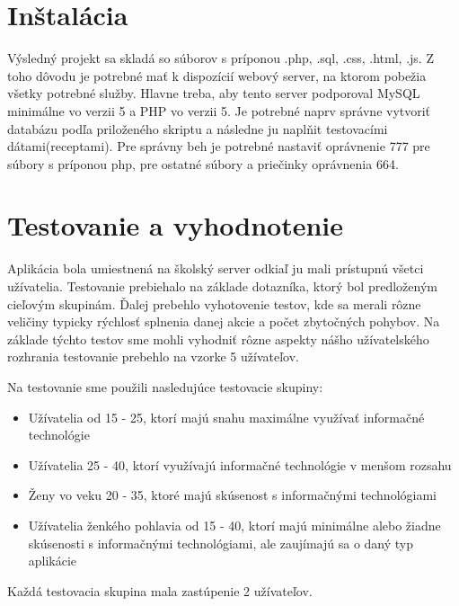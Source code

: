 \documentclass[12pt,a4paper,titlepage,final]{article}
\begin{document}
\section{Inštalácia}
Výsledný projekt sa skladá so súborov s príponou .php, .sql, .css, .html, .js. Z toho dôvodu je potrebné mať k dispozícií webový server, na ktorom pobežia všetky potrebné služby. Hlavne treba, aby tento server podporoval MySQL minimálne vo verzii 5 a PHP vo verzii 5. Je potrebné naprv správne vytvoriť databázu podľa priloženého skriptu a následne ju naplňit testovacími dátami(receptami). Pre správny beh je potrebné nastaviť oprávnenie 777 pre súbory s príponou php, pre ostatné súbory a priečinky oprávnenia 664.

\section{Testovanie a vyhodnotenie}
Aplikácia bola umiestnená na školský server odkiaľ ju mali prístupnú všetci užívatelia. Testovanie prebiehalo na základe dotazníka, ktorý bol predloženým cieľovým skupinám. Ďalej prebehlo vyhotovenie testov, kde sa merali rôzne veličiny typicky rýchlosť splnenia danej akcie a počet zbytočných pohybov. Na základe týchto testov sme mohli vyhodniť rôzne aspekty nášho užívatelského rozhrania testovanie prebehlo na vzorke 5 užívateľov. 

Na testovanie sme použili nasledujúce testovacie skupiny:
\begin{itemize}
\item Užívatelia od 15 - 25, ktorí majú snahu maximálne využívať informačné technológie
\item Užívatelia 25 - 40, ktorí využívajú informačné technológie v menšom rozsahu
\item Ženy vo veku 20 - 35, ktoré majú skúsenost s informačnými technológiami
\item Užívatelia ženkého pohlavia od 15 - 40, ktorí majú minimálne alebo žiadne skúsenosti s informačnými technológiami, ale zaujímajú sa o daný typ aplikácie
\end{itemize}
Každá testovacia skupina mala zastúpenie 2 užívateľov.
\end{document}
